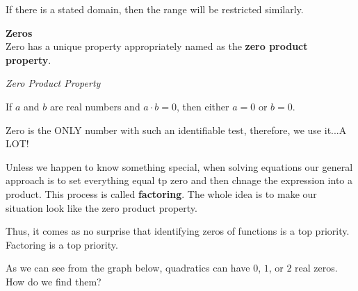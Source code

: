 \documentclass{ximera}
\begin{document}
If there is a stated domain, then the range will be restricted similarly.




\textbf{Zeros} \\

Zero has a unique property appropriately named as the \textbf{zero product property}.  



\begin{fact} \textit {Zero Product Property}

If $a$ and $b$ are real numbers and $a\cdot b = 0$, then either $a=0$ or $b=0$.

\end{fact}


Zero is the ONLY number with such an identifiable test, therefore, we use it...A LOT! 


Unless we happen to know something special, when solving equations our general approach is to set everything equal tp zero and then chnage the expression into a product.  This process is called \textbf{factoring}.  The whole idea is to make our situation look like the zero product property.

Thus, it comes as no surprise that identifying zeros of functions is a top priority.  Factoring is a top priority.

As we can see from the graph below, quadratics can have $0$, $1$, or $2$ real zeros.  How do we find them?







\begin{image}
\end{image}
\end{document}

